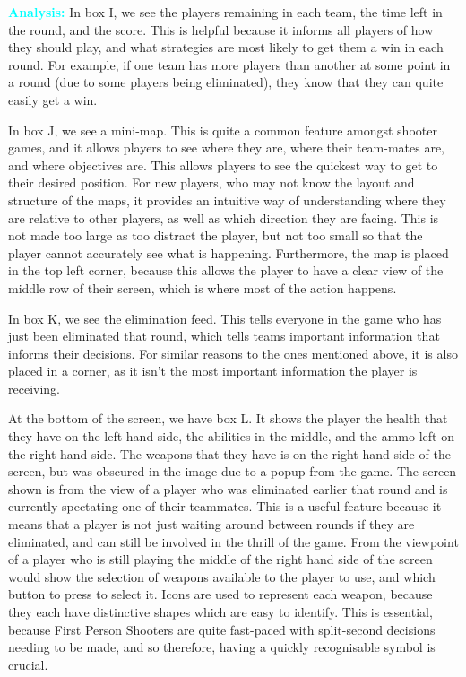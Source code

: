 \vs

\textcolor{cyan}{\textbf{Analysis:}}
In box I, we see the players remaining in each team, the time left in the round, and the score. This is helpful because it informs all players of how they should play, and what strategies are most likely to get them a win in each round. For example, if one team has more players than another at some point in a round (due to some players being eliminated), they know that they can quite easily get a win.

\vs
In box J, we see a mini-map. This is quite a common feature amongst shooter games, and it allows players to see where they are, where their team-mates are, and where objectives are. This allows players to see the quickest way to get to their desired position. For new players, who may not know the layout and structure of the maps, it provides an intuitive way of understanding where they are relative to other players, as well as which direction they are facing. This is not made too large as too distract the player, but not too small so that the player cannot accurately see what is happening. Furthermore, the map is placed in the top left corner, because this allows the player to have a clear view of the middle row of their screen, which is where most of the action happens.

\vs
In box K, we see the elimination feed. This tells everyone in the game who has just been eliminated that round, which tells teams important information that informs their decisions. For similar reasons to the ones mentioned above, it is also placed in a corner, as it isn't the most important information the player is receiving.

\vs
At the bottom of the screen, we have box L. It shows the player the health that they have on the left hand side, the abilities in the middle, and the ammo left on the right hand side. The weapons that they have is on the right hand side of the screen, but was obscured in the image due to a popup from the game. The screen shown is from the view of a player who was eliminated earlier that round and is currently spectating one of their teammates. This is a useful feature because it means that a player is not just waiting around between rounds if they are eliminated, and can still be involved in the thrill of the game. From the viewpoint of a player who is still playing the middle of the right hand side of the screen would show the selection of weapons available to the player to use, and which button to press to select it. Icons are used to represent each weapon, because they each have distinctive shapes which are easy to identify. This is essential, because First Person Shooters are quite fast-paced with split-second decisions needing to be made, and so therefore, having a quickly recognisable symbol is crucial.



